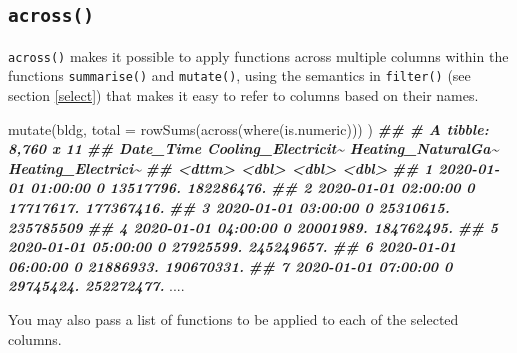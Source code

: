 \documentclass[
]{book}
\newenvironment{Shaded}{\begin{snugshade}}{\end{snugshade}}
\newcommand{\AttributeTok}[1]{\textcolor[rgb]{0.77,0.63,0.00}{#1}}
\newcommand{\DocumentationTok}[1]{\textcolor[rgb]{0.56,0.35,0.01}{\textbf{\textit{#1}}}}
\newcommand{\FunctionTok}[1]{\textcolor[rgb]{0.00,0.00,0.00}{#1}}
\newcommand{\NormalTok}[1]{#1}
\begin{document}
\hypertarget{across}{%
\subsection{\texorpdfstring{\texttt{across()}}{across()}}\label{across}}

\texttt{across()} makes it possible to apply functions across multiple columns within the functions \texttt{summarise()} and \texttt{mutate()}, using the semantics in \texttt{filter()} (see section \ref{select}) that makes it easy to refer to columns based on their names.

\begin{Shaded}
\begin{Highlighting}[]

\FunctionTok{mutate}\NormalTok{(bldg,}
  \AttributeTok{total =} \FunctionTok{rowSums}\NormalTok{(}\FunctionTok{across}\NormalTok{(}\FunctionTok{where}\NormalTok{(is.numeric)))}
\NormalTok{)}
\DocumentationTok{\#\# \# A tibble: 8,760 x 11}
\DocumentationTok{\#\#    Date\_Time           Cooling\_Electricit\textasciitilde{} Heating\_NaturalGa\textasciitilde{} Heating\_Electrici\textasciitilde{}}
\DocumentationTok{\#\#    \textless{}dttm\textgreater{}                            \textless{}dbl\textgreater{}              \textless{}dbl\textgreater{}              \textless{}dbl\textgreater{}}
\DocumentationTok{\#\#  1 2020{-}01{-}01 01:00:00                   0          13517796.         182286476.}
\DocumentationTok{\#\#  2 2020{-}01{-}01 02:00:00                   0          17717617.         177367416.}
\DocumentationTok{\#\#  3 2020{-}01{-}01 03:00:00                   0          25310615.         235785509 }
\DocumentationTok{\#\#  4 2020{-}01{-}01 04:00:00                   0          20001989.         184762495.}
\DocumentationTok{\#\#  5 2020{-}01{-}01 05:00:00                   0          27925599.         245249657.}
\DocumentationTok{\#\#  6 2020{-}01{-}01 06:00:00                   0          21886933.         190670331.}
\DocumentationTok{\#\#  7 2020{-}01{-}01 07:00:00                   0          29745424.         252272477.}
\NormalTok{....}
\end{Highlighting}
\end{Shaded}

You may also pass a list of functions to be applied to each of the selected columns.
\end{document}
